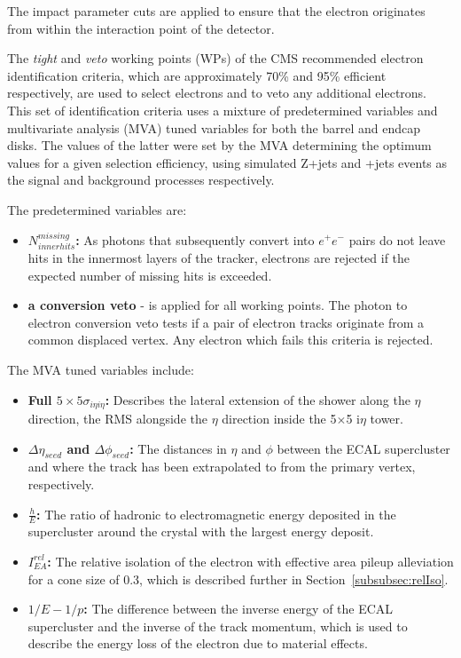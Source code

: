 The impact parameter cuts are applied to ensure that the electron originates from within the interaction point of the detector.

The \emph{tight} and \emph{veto} working points (WPs) of the CMS recommended electron identification criteria, which are approximately 70\% and 95\% efficient respectively, are used to select electrons and to veto any additional electrons.
This set of identification criteria uses a mixture of predetermined variables and multivariate analysis (MVA) tuned variables for both the barrel and endcap disks.
The values of the latter were set by the MVA determining the optimum values for a given selection efficiency, using simulated Z+jets and \ttbar+jets events as the signal and background processes respectively.

The predetermined variables are:
\begin{itemize}
\item \textbf{$N^{missing}_{inner hits}$:} As photons that subsequently convert into $e^{+} e^{-}$ pairs do not leave hits in the innermost layers of the tracker, electrons are rejected if the expected number of missing hits is exceeded.
\item \textbf{a conversion veto} - is applied for all working points. The photon to electron conversion veto tests if a pair of electron tracks originate from a common displaced vertex. Any electron which fails this criteria is rejected.
\end{itemize}

The MVA tuned variables include:
\begin{itemize}
\item \textbf{Full $5 \times 5 \sigma_{i\eta i\eta}$:} Describes the lateral extension of the shower along the $\eta$ direction, \ie the RMS alongside the $\eta$ direction inside the 5$\times$5 i$\eta$ tower.
\item \textbf{$\Delta \eta_{seed}$ and $\Delta \phi_{seed}$:} The distances in $\eta$ and $\phi$ between the ECAL supercluster and where the track has been extrapolated to from the primary vertex, respectively.
\item \textbf{$\frac{h}{E}$:} The ratio of hadronic to electromagnetic energy deposited in the supercluster around the crystal with the largest energy deposit.
\item \textbf{$I^{rel}_{EA}$:} The relative isolation of the electron with effective area pileup alleviation for a cone size of 0.3, which is described further in Section~\ref{subsubsec:relIso}.
\item \textbf{$1/E - 1/p$:} The difference between the inverse energy of the ECAL supercluster and the inverse of the track momentum, which is used to describe the energy loss of the electron due to material effects.
\end{itemize}

